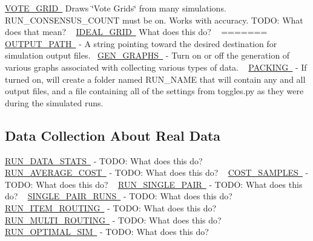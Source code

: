  \mbox{\hyperlink{namespacedynamicfilterapp_1_1toggles_abd2acb6c03d6ca650537592475fc69e4}{V\+O\+T\+E\+\_\+\+G\+R\+ID }} Draws \char`\"{}\+Vote Grids\char`\"{} from many simulations. R\+U\+N\+\_\+\+C\+O\+N\+S\+E\+N\+S\+U\+S\+\_\+\+C\+O\+U\+NT must be on. Works with accuracy. T\+O\+DO\+: What does that mean? ~\newline
 \mbox{\hyperlink{namespacedynamicfilterapp_1_1toggles_a42311c82a77ac3b1c03bf7b9c6619be2}{I\+D\+E\+A\+L\+\_\+\+G\+R\+ID }} What does this do? ~\newline
=======
\mbox{\hyperlink{}{O\+U\+T\+P\+U\+T\+\_\+\+P\+A\+TH }} -\/ A string pointing toward the desired destination for simulation output files.~\newline
 \mbox{\hyperlink{}{G\+E\+N\+\_\+\+G\+R\+A\+P\+HS }} -\/ Turn on or off the generation of various graphs associated with collecting various types of data. ~\newline
 \mbox{\hyperlink{}{P\+A\+C\+K\+I\+NG }} -\/ If turned on, will create a folder named R\+U\+N\+\_\+\+N\+A\+ME that will contain any and all output files, and a file containing all of the settings from toggles.\+py as they were during the simulated runs. ~\newline
 \hypertarget{toggles_data}{}\subsection{Data Collection About Real Data}\label{toggles_data}
\mbox{\hyperlink{}{R\+U\+N\+\_\+\+D\+A\+T\+A\+\_\+\+S\+T\+A\+TS }} -\/ T\+O\+DO\+: What does this do? ~\newline
 \mbox{\hyperlink{}{R\+U\+N\+\_\+\+A\+V\+E\+R\+A\+G\+E\+\_\+\+C\+O\+ST }} -\/ T\+O\+DO\+: What does this do? ~\newline
 \mbox{\hyperlink{}{C\+O\+S\+T\+\_\+\+S\+A\+M\+P\+L\+ES }} -\/ T\+O\+DO\+: What does this do? ~\newline
 \mbox{\hyperlink{}{R\+U\+N\+\_\+\+S\+I\+N\+G\+L\+E\+\_\+\+P\+A\+IR }} -\/ T\+O\+DO\+: What does this do? ~\newline
 \mbox{\hyperlink{}{S\+I\+N\+G\+L\+E\+\_\+\+P\+A\+I\+R\+\_\+\+R\+U\+NS }} -\/ T\+O\+DO\+: What does this do? ~\newline
 \mbox{\hyperlink{}{R\+U\+N\+\_\+\+I\+T\+E\+M\+\_\+\+R\+O\+U\+T\+I\+NG }} -\/ T\+O\+DO\+: What does this do? ~\newline
 \mbox{\hyperlink{}{R\+U\+N\+\_\+\+M\+U\+L\+T\+I\+\_\+\+R\+O\+U\+T\+I\+NG }} -\/ T\+O\+DO\+: What does this do? ~\newline
 \mbox{\hyperlink{}{R\+U\+N\+\_\+\+O\+P\+T\+I\+M\+A\+L\+\_\+\+S\+IM }} -\/ T\+O\+DO\+: What does this do? ~\newline
